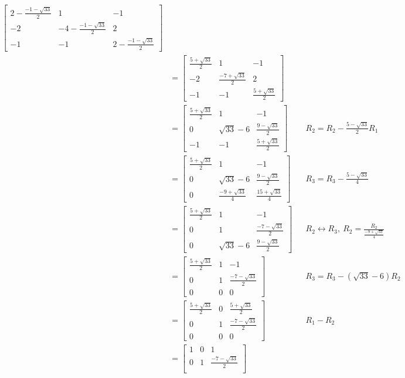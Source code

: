 \documentclass[letterpaper,10pt]{article}
\begin{document}
\begin{enumerate}
\begin{align*}
\begin{bmatrix}
2-\frac{-1-\sqrt{33}}{2} & 1 & -1\\
-2 & -4-\frac{-1-\sqrt{33}}{2} & 2\\
-1 & -1 & 2-\frac{-1-\sqrt{33}}{2}
\end{bmatrix}\\
&=\begin{bmatrix}
\frac{5+\sqrt{33}}{2} & 1 & -1\\
-2 & \frac{-7+\sqrt{33}}{2} & 2\\
-1 & -1 & \frac{5+\sqrt{33}}{2}
\end{bmatrix}\\
&=\begin{bmatrix}
\frac{5+\sqrt{33}}{2} & 1 & -1\\
0 & \sqrt{33}-6 & \frac{9-\sqrt{33}}{2}\\
-1 & -1 & \frac{5+\sqrt{33}}{2}
\end{bmatrix} && R_2=R_2-\frac{5-\sqrt{33}}{2}R_1\\
&=\begin{bmatrix}
\frac{5+\sqrt{33}}{2} & 1 & -1\\
0 & \sqrt{33}-6 & \frac{9-\sqrt{33}}{2}\\
0 & \frac{-9+\sqrt{33}}{4} & \frac{15+\sqrt{33}}{4}
\end{bmatrix} && R_3=R_3-\frac{5-\sqrt{33}}{4}\\
&=\begin{bmatrix}
\frac{5+\sqrt{33}}{2} & 1 & -1\\
0 & 1 & \frac{-7-\sqrt{33}}{2}\\
0 & \sqrt{33}-6 & \frac{9-\sqrt{33}}{2}
\end{bmatrix} && R_2\leftrightarrow R_3,\ R_2=\frac{R_2}{\frac{-9+\sqrt{33}}{4}}\\
&=\begin{bmatrix}
\frac{5+\sqrt{33}}{2} & 1 & -1\\
0 & 1 & \frac{-7-\sqrt{33}}{2}\\
0 & 0 & 0
\end{bmatrix} && R_3=R_3-(\sqrt{33}-6)R_2\\
&=\begin{bmatrix}
\frac{5+\sqrt{33}}{2} & 0 & \frac{5+\sqrt{33}}{2}\\
0 & 1 & \frac{-7-\sqrt{33}}{2}\\
0 & 0 & 0
\end{bmatrix} && R_1-R_2\\
&=\begin{bmatrix}
1 & 0 & 1\\
0 & 1 & \frac{-7-\sqrt{33}}{2}\\

\end{bmatrix}
\end{align*}
\end{enumerate}
\end{document}
